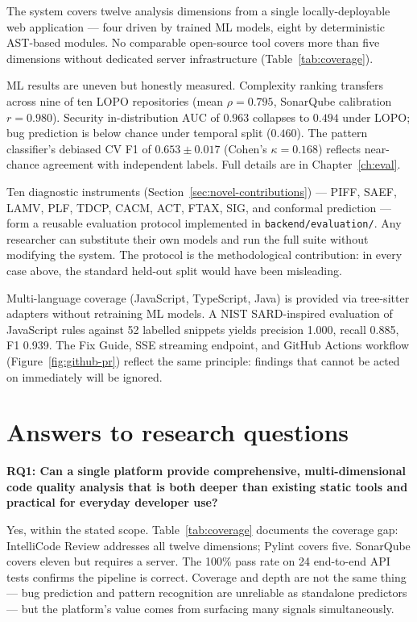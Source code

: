 \documentclass[12pt, oneside]{report}
\begin{document}
The system covers twelve analysis dimensions from a single locally-deployable web application — four driven by trained ML models, eight by deterministic AST-based modules. No comparable open-source tool covers more than five dimensions without dedicated server infrastructure (Table~\ref{tab:coverage}).

ML results are uneven but honestly measured. Complexity ranking transfers across nine of ten LOPO repositories (mean $\rho = 0.795$, SonarQube calibration $r = 0.980$). Security in-distribution AUC of $0.963$ collapses to $0.494$ under LOPO; bug prediction is below chance under temporal split ($0.460$). The pattern classifier's debiased CV F1 of $0.653 \pm 0.017$ (Cohen's $\kappa = 0.168$) reflects near-chance agreement with independent labels. Full details are in Chapter~\ref{ch:eval}.

Ten diagnostic instruments (Section~\ref{sec:novel-contributions}) — PIFF, SAEF, LAMV, PLF, TDCP, CACM, ACT, FTAX, SIG, and conformal prediction — form a reusable evaluation protocol implemented in \texttt{backend/evaluation/}. Any researcher can substitute their own models and run the full suite without modifying the system. The protocol is the methodological contribution: in every case above, the standard held-out split would have been misleading.

Multi-language coverage (JavaScript, TypeScript, Java) is provided via tree-sitter adapters without retraining ML models. A NIST SARD-inspired evaluation of JavaScript rules against 52 labelled snippets yields precision 1.000, recall 0.885, F1 0.939. The Fix Guide, SSE streaming endpoint, and GitHub Actions workflow (Figure~\ref{fig:github-pr}) reflect the same principle: findings that cannot be acted on immediately will be ignored.

\section{Answers to research questions}
\label{sec:rq-answers}

\textbf{RQ1: Can a single platform provide comprehensive, multi-dimensional code quality analysis that is both deeper than existing static tools and practical for everyday developer use?}

Yes, within the stated scope. Table~\ref{tab:coverage} documents the coverage gap: IntelliCode Review addresses all twelve dimensions; Pylint covers five. SonarQube covers eleven but requires a server. The 100\% pass rate on 24 end-to-end API tests confirms the pipeline is correct. Coverage and depth are not the same thing — bug prediction and pattern recognition are unreliable as standalone predictors — but the platform's value comes from surfacing many signals simultaneously.
\end{document}
